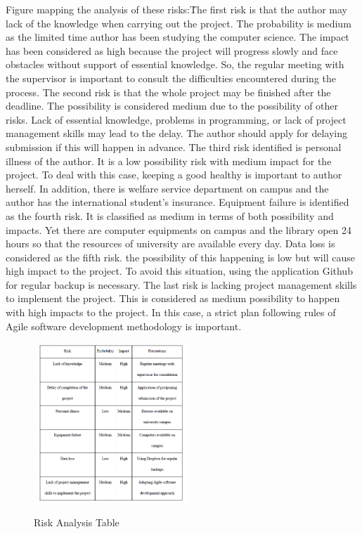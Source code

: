 Figure \label{riskAnalysis} mapping the analysis of these risks:\.
The first risk is that the author may lack of the knowledge when carrying out the project. The probability is medium as the limited time author has been studying the computer science. The impact has been considered as high because the project will progress slowly and face obstacles without support of essential knowledge. So, the regular meeting with the supervisor is important to consult the difficulties encountered during the process.   
The second risk is that the whole project may be finished after the deadline. The possibility is considered medium due to the possibility of other risks. Lack of essential knowledge, problems in programming, or lack of project management skills may lead to the delay. The author should apply for delaying submission if this will happen in advance. 
The third risk identified is personal illness of the author. It is a low possibility risk with medium impact for the project. To deal with this case, keeping a good healthy is important to author herself. In addition, there is welfare service department on campus and the author has the international student’s insurance. 
Equipment failure is identified as the fourth risk. It is classified as medium in terms of both possibility and impacts. Yet there are computer equipments on campus and the library open 24 hours so that the resources of university are available every day. 
Data loss is considered as the fifth risk. the possibility of this happening is low but will cause high impact to the project. To avoid this situation, using the application Github for regular backup is necessary. 
The last risk is lacking project management skills to implement the project. This is considered as medium possibility to happen with high impacts to the project. In this case, a strict plan following rules of Agile software development methodology is important.

\begin{figure}[h]
	\centering	
	\includegraphics[width=6cm, height=6cm]{Figs/Risk-Analysis}\\[1ex]
	\caption{Risk Analysis Table }
	\label{fig:riskAnalysis}
\end{figure}

